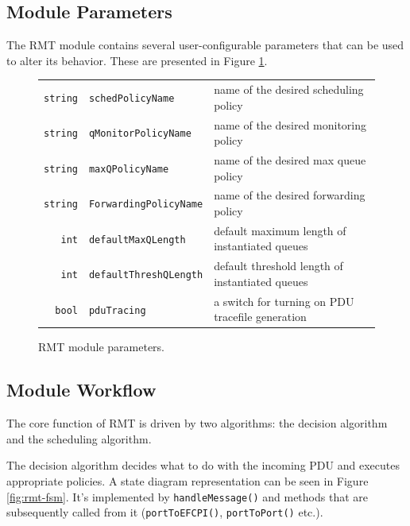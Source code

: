         \subsection{Module Parameters}
            The RMT module contains several user-configurable parameters that can be used to alter its behavior. These are presented in Figure \ref{fig:rmt_params}.

            \begin{figure}[H]
                \begin{center}
                  \begin{tabular}{ r l | l }
                    \hline
                    \texttt{string} & \texttt{schedPolicyName} & name of the desired scheduling policy \\
                    \texttt{string} & \texttt{qMonitorPolicyName} & name of the desired monitoring policy \\
                    \texttt{string} & \texttt{maxQPolicyName} & name of the desired max queue policy \\
                    \texttt{string} & \texttt{ForwardingPolicyName} & name of the desired forwarding policy \\
                    \texttt{int} & \texttt{defaultMaxQLength} & default maximum length of instantiated queues \\
                    \texttt{int} & \texttt{defaultThreshQLength} & default threshold length of instantiated queues \\
                    \texttt{bool} & \texttt{pduTracing} & a switch for turning on PDU tracefile generation \\
                    \hline
                  \end{tabular}
                  \caption{RMT module parameters.}
                  \label{fig:rmt_params}
                \end{center}
            \end{figure}



        \subsection{Module Workflow}

            The core function of RMT is driven by two algorithms: the decision algorithm and the scheduling algorithm.

            The decision algorithm decides what to do with the incoming PDU and executes appropriate policies. A state diagram representation can be seen in Figure \ref{fig:rmt-fsm}. It's implemented by \texttt{handleMessage()} and methods that are subsequently called from it (\texttt{portToEFCPI()}, \texttt{portToPort()} etc.).

